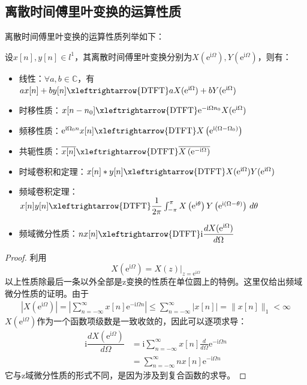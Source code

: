 \subsection{离散时间傅里叶变换的运算性质}\label{sub:property_of_dtft}

离散时间傅里叶变换的运算性质列举如下：
\begin{proposition}[离散时间傅里叶变换的运算性质]
    设$x[n],y[n]\in l^1$，其离散时间傅里叶变换分别为$X(\mathrm{e}^{\mathrm{i}\Omega}),Y(\mathrm{e}^{\mathrm{i}\Omega})$，则有：\begin{itemize}
        \item  线性：$\forall a,b\in\mathbb{C}$，有$a x[n]+b y[n]\xleftrightarrow{\mathrm{DTFT}} a X(\mathrm{e}^{\mathrm{i}\Omega})+b Y(\mathrm{e}^{\mathrm{i}\Omega})$
        \item 时移性质：$x[n-n_0]\xleftrightarrow{\mathrm{DTFT}}\mathrm{e}^{-\mathrm{i}\Omega n_0}X(\mathrm{e}^{\mathrm{i}\Omega})$
        \item 频移性质：$\mathrm{e}^{\mathrm{i}\Omega_0 n}x[n]\xleftrightarrow{\mathrm{DTFT}}X\left(\mathrm{e}^{\mathrm{i}(\Omega-\Omega_0)}\right)$
        \item 共轭性质：$\overline{x[n]}\xleftrightarrow{\mathrm{DTFT}}\overline{X\left(\mathrm{e}^{-\mathrm{i}\Omega}\right)}$
        \item 时域卷积和定理：$x[n]*y[n]\xleftrightarrow{\mathrm{DTFT}}X(\mathrm{e}^{\mathrm{i}\Omega})Y(\mathrm{e}^{\mathrm{i}\Omega})$
        \item 频域卷积定理：$x[n]y[n]\xleftrightarrow{\mathrm{DTFT}}\dfrac{1}{2\pi}\int_{-\pi}^{\pi}X\left(\mathrm{e}^{\mathrm{i}\theta}\right)Y\left(\mathrm{e}^{\mathrm{i}(\Omega-\theta)}\right)\,d\theta$
        \item 频域微分性质：$nx[n]\xleftrightarrow{\mathrm{DTFT}}\mathrm{i}\dfrac{dX(\mathrm{e}^{\mathrm{i}\Omega})}{d\Omega}$
    \end{itemize}
\end{proposition}
\begin{proof}
    利用\[X(\mathrm{e}^{\mathrm{i}\Omega})=X(z)|_{z=\mathrm{e}^{\mathrm{i}\Omega}}\]
    以上性质除最后一条以外全部是z变换的性质在单位圆上的特例。这里仅给出频域微分性质的证明。由于
    \begin{align*}
        \left|X(\mathrm{e}^{\mathrm{i}\Omega})\right|=\left|\sum_{n=-\infty}^{\infty}x[n]\mathrm{e}^{-\mathrm{i}\Omega n}\right|\leq \sum_{n=-\infty}^{\infty}|x[n]|=\|x[n]\|_1<\infty
    \end{align*}
    $X(\mathrm{e}^{\mathrm{i}\Omega})$作为一个函数项级数是一致收敛的，因此可以逐项求导：
    \begin{align*}
        \mathrm{i}\dfrac{dX(\mathrm{e}^{\mathrm{i}\Omega})}{d\Omega}&=\mathrm{i}\sum_{n=-\infty}^{\infty}x[n]\frac{d}{d\Omega}\mathrm{e}^{-\mathrm{i}\Omega n}\\
        &=\sum_{n=-\infty}^{\infty}nx[n]\mathrm{e}^{-\mathrm{i}\Omega n}
    \end{align*}
    它与z域微分性质的形式不同，是因为涉及到复合函数的求导。
\end{proof}

